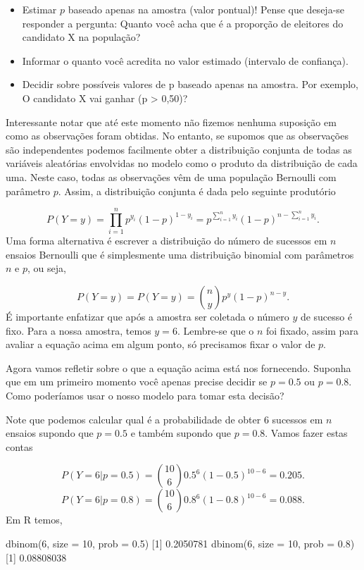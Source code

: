 \documentclass[
  10pt,
  a4paper]{book}
\newenvironment{Shaded}{\begin{snugshade}}{\end{snugshade}}
\newcommand{\AttributeTok}[1]{\textcolor[rgb]{0.77,0.63,0.00}{#1}}
\newcommand{\DecValTok}[1]{\textcolor[rgb]{0.00,0.00,0.81}{#1}}
\newcommand{\FloatTok}[1]{\textcolor[rgb]{0.00,0.00,0.81}{#1}}
\newcommand{\FunctionTok}[1]{\textcolor[rgb]{0.00,0.00,0.00}{#1}}
\newcommand{\NormalTok}[1]{#1}
\providecommand{\tightlist}{%
  \setlength{\itemsep}{0pt}\setlength{\parskip}{0pt}}
\begin{document}
\begin{itemize}
\tightlist
\item
  Estimar \(p\) baseado apenas na amostra (valor pontual)! Pense que deseja-se responder a pergunta: Quanto você acha que é a proporção de eleitores do candidato X na população?
\item
  Informar o quanto você acredita no valor estimado (intervalo de confiança).
\item
  Decidir sobre possíveis valores de p baseado apenas na amostra. Por exemplo, O candidato X vai ganhar (p \textgreater{} 0,50)?
\end{itemize}

Interessante notar que até este momento não fizemos nenhuma suposição em como as observações foram obtidas. No entanto, se supomos que as observações são independentes podemos facilmente obter a distribuição conjunta de todas as variáveis aleatórias envolvidas no modelo como o produto da distribuição de cada uma. Neste caso, todas as observações vêm de uma população Bernoulli com parâmetro \(p\). Assim, a distribuição conjunta é dada pelo seguinte produtório

\[
P(Y = y) = \prod_{i=1}^{n} p^{y_i} (1-p)^{1-y_i} = p^{\sum_{i=1}^n y_i} (1-p)^{n - \sum_{i=1}^n y_i}.
\]
Uma forma alternativa é escrever a distribuição do número de sucessos em \(n\) ensaios Bernoulli que é simplesmente uma distribuição binomial com parâmetros \(n\) e \(p\), ou seja,

\[
P(Y = y) = P(Y = y) = \binom{n}{y} p^y (1-p)^{n-y}.
\]
É importante enfatizar que após a amostra ser coletada o número \(y\) de sucesso é fixo. Para a nossa amostra, temos \(y = 6\). Lembre-se que o \(n\) foi fixado, assim para avaliar a equação acima em algum ponto, só precisamos fixar o valor de \(p\).

Agora vamos refletir sobre o que a equação acima está nos fornecendo. Suponha que em um primeiro momento você apenas precise decidir se \(p = 0.5\) ou \(p = 0.8\). Como poderíamos usar o nosso modelo para tomar esta decisão?

Note que podemos calcular qual é a probabilidade de obter \(6\) sucessos em \(n\) ensaios supondo que \(p = 0.5\) e também supondo que \(p = 0.8\). Vamos fazer estas contas

\[
P(Y = 6 | p = 0.5) = \binom{10}{6} 0.5^6 (1-0.5)^{10-6} = 0.205.
\]
\[
P(Y = 6 | p = 0.8) = \binom{10}{6} 0.8^6 (1-0.8)^{10-6} = 0.088.
\]
Em R temos,

\begin{Shaded}
\begin{Highlighting}[]
\FunctionTok{dbinom}\NormalTok{(}\DecValTok{6}\NormalTok{, }\AttributeTok{size =} \DecValTok{10}\NormalTok{, }\AttributeTok{prob =} \FloatTok{0.5}\NormalTok{)}
\NormalTok{[}\DecValTok{1}\NormalTok{] }\FloatTok{0.2050781}
\FunctionTok{dbinom}\NormalTok{(}\DecValTok{6}\NormalTok{, }\AttributeTok{size =} \DecValTok{10}\NormalTok{, }\AttributeTok{prob =} \FloatTok{0.8}\NormalTok{)}
\NormalTok{[}\DecValTok{1}\NormalTok{] }\FloatTok{0.08808038}
\end{Highlighting}
\end{Shaded}
\end{document}
